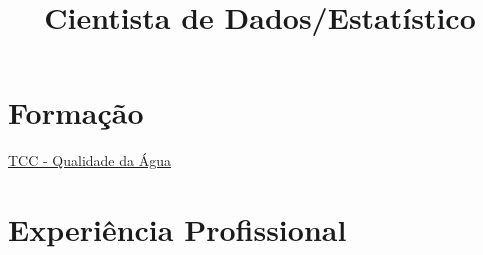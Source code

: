 \documentclass[11pt,a4paper,sans]{moderncv} %
\title{\normalfont Cientista de Dados/Estatístico}
\begin{document}


\makecvtitle %


\section{Formação}

{\href{https://github.com/GabrielSartori/Monografia}{TCC - Qualidade da Água}}{}





% 


\section{Experiência Profissional}

\end{document}
